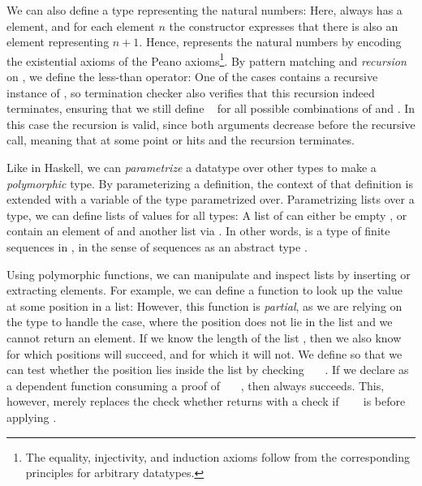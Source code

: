 We can also define a type representing the natural numbers:
Here, \bN{} always has a  element, and for each element $n$ the constructor  expresses that there is also an element representing $n + 1$. Hence, \bN{} represents the natural numbers by encoding the existential axioms of the Peano axioms\footnote{The equality, injectivity, and induction axioms follow from the corresponding principles for arbitrary datatypes.}. By pattern matching and \emph{recursion} on \bN{}, we define the less-than operator:
One of the cases contains a recursive instance of \bN{}, so termination checker also verifies that this recursion indeed terminates, ensuring that we still define \   for all possible combinations of  and . In this case the recursion is valid, since both arguments decrease before the recursive call, meaning that at some point  or  hits  and the recursion terminates.

Like in Haskell, we can \emph{parametrize} a datatype over other types to make a \emph{polymorphic} type. By parameterizing a definition, the context of that definition is extended with a variable of the type parametrized over. Parametrizing lists over a type, we can define lists of values for all types:
A list of  can either be empty \AIC{[]}, or contain an element of  and another list via . In other words,  is a type of finite sequences in , in the sense of sequences as an abstract type \cite{purelyfunctional}.

Using polymorphic functions, we can manipulate and inspect lists by inserting or extracting elements. For example, we can define a function to look up the value at some position  in a list:
However, this function is \emph{partial}, as we are relying on the type
to handle the \AIC{[]} case, where the position does not lie in the list and we cannot return an element. If we know the length of the list , then we also know for which positions  will succeed, and for which it will not. We define 
so that we can test whether the position  lies inside the list by checking \ \ \ . If we declare  as a dependent function consuming a proof of \ \ \ , then  always succeeds. This, however, merely replaces the check whether  returns  with a check if \ \ \  is before applying .

